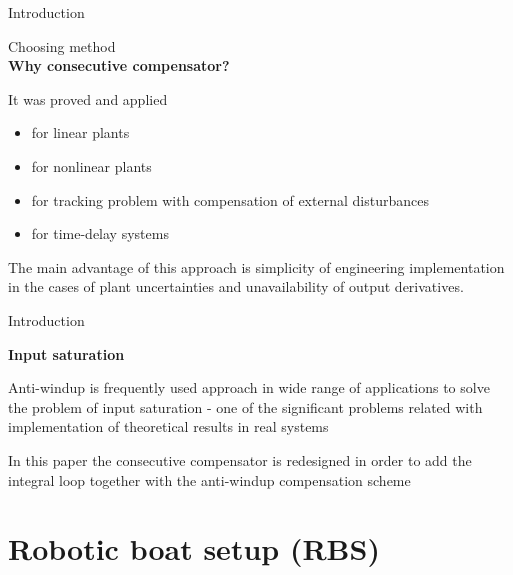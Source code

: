\documentclass[10pt,pdf,hyperref={unicode}]{beamer}
\begin{document}
\begin{frame}{Introduction}
	
\begin{center}
{\Large Choosing method\\
	\vspace{0.5cm}
	\textbf{Why consecutive compensator?}}
\end{center}

\vspace{0.3cm}

It was proved and applied 
\begin{itemize}
	\item for linear plants
	\item for nonlinear plants
	\item for tracking problem with compensation of external disturbances
	\item  for time-delay systems 
\end{itemize}

\vspace{0.3cm}

The main advantage of this approach is simplicity of engineering implementation in the cases of plant uncertainties and unavailability of output derivatives.

\end{frame}

\begin{frame}{Introduction}
	
	\begin{center}
		{\Large \textbf {Input saturation}\\}
	\end{center}
	
	\vspace{0.3cm}
	
	Anti-windup is frequently used approach in wide range of applications to solve the problem of input saturation - one of the significant problems related with implementation of theoretical results in real systems
	
	\vspace{0.3cm}
	
	In this paper the consecutive compensator is redesigned in order to add the integral loop together with the anti-windup compensation scheme
	
\end{frame}

\section{Robotic boat setup (RBS)}
\end{document}
